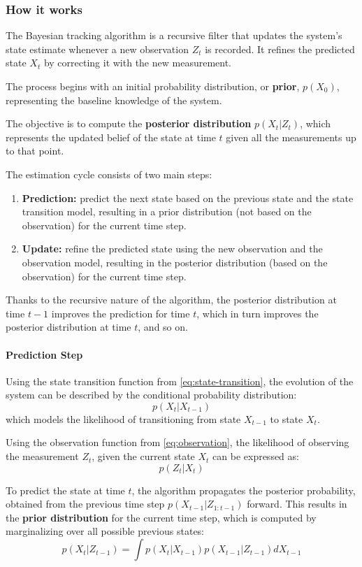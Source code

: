 \subsubsection{How it works}
The Bayesian tracking algorithm is a recursive filter that updates the system's state estimate whenever a 
new observation $Z_t$ is recorded. It refines the predicted state $X_t$ by correcting it with the new measurement.

The process begins with an initial probability distribution, or \textbf{prior}, $p(X_0)$, 
representing the baseline knowledge of the system. 

The objective is to compute the \textbf{posterior distribution} $p(X_t | Z_{t})$, which represents the updated belief of the state at time 
$t$ given all the measurements up to that point.

The estimation cycle consists of two main steps:
\begin{enumerate}
    \item \textbf{Prediction:} predict the next state based on the previous state and the state transition model, 
    resulting in a prior distribution (not based on the observation) for the current time step.
    \item \textbf{Update:} refine the predicted state using the new observation and the observation model, 
    resulting in the posterior distribution (based on the observation) for the current time step.
\end{enumerate}
Thanks to the recursive nature of the algorithm, the posterior distribution at time $t-1$ improves the prediction for time $t$, 
which in turn improves the posterior distribution at time $t$, and so on.

\paragraph{Prediction Step}
Using the state transition function from \ref{eq:state-transition}, the evolution of the system can be described by the conditional probability distribution:
$$p(X_t | X_{t-1})$$
which models the likelihood of transitioning from state $X_{t-1}$ to state $X_t$.

Using the observation function from \ref{eq:observation}, the likelihood of observing the measurement $Z_t$, 
given the current state $X_t$ can be expressed as:
$$p(Z_t | X_t)$$

To predict the state at time $t$, the algorithm propagates the posterior probability, obtained from the previous time step 
$p(X_{t-1} | Z_{1:t-1})$ forward.
This results in the \textbf{prior distribution} for the current time step, which is computed by marginalizing 
over all possible previous states:
$$p(X_t | Z_{t-1}) = \int p(X_t | X_{t-1}) p(X_{t-1} | Z_{t-1}) dX_{t-1}$$

